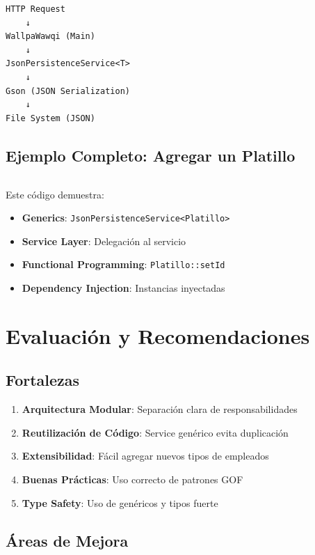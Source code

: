 \documentclass[12pt, a4paper]{report}
\begin{document}
\begin{verbatim}
HTTP Request
    ↓
WallpaWawqi (Main)
    ↓
JsonPersistenceService<T>
    ↓
Gson (JSON Serialization)
    ↓
File System (JSON)
\end{verbatim}

\section{Ejemplo Completo: Agregar un Platillo}

\inputminted[firstline=45, lastline=65]{java}{../../src/main/java/com/wallpawawqi/WallpaWawqi.java}

Este código demuestra:
\begin{itemize}
    \item \textbf{Generics}: \texttt{JsonPersistenceService<Platillo>}
    \item \textbf{Service Layer}: Delegación al servicio
    \item \textbf{Functional Programming}: \texttt{Platillo::setId}
    \item \textbf{Dependency Injection}: Instancias inyectadas
\end{itemize}

\newpage

\chapter{Evaluación y Recomendaciones}

\section{Fortalezas}

\begin{enumerate}
    \item \textbf{Arquitectura Modular}: Separación clara de responsabilidades
    \item \textbf{Reutilización de Código}: Service genérico evita duplicación
    \item \textbf{Extensibilidad}: Fácil agregar nuevos tipos de empleados
    \item \textbf{Buenas Prácticas}: Uso correcto de patrones GOF
    \item \textbf{Type Safety}: Uso de genéricos y tipos fuerte
\end{enumerate}

\section{Áreas de Mejora}
\end{document}

